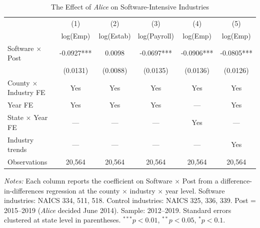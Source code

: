 \begin{table}[t]
\centering
\caption{The Effect of \textit{Alice} on Software-Intensive Industries}
\label{tab:main}
\begin{tabular}{lccccc}
\toprule
 & (1) & (2) & (3) & (4) & (5) \\
 & log(Emp) & log(Estab) & log(Payroll) & log(Emp) & log(Emp) \\
\midrule
Software $\times$ Post & -0.0927*** & 0.0098 & -0.0697*** & -0.0906*** & -0.0805*** \\
 & (0.0131) & (0.0088) & (0.0135) & (0.0136) & (0.0126) \\
\midrule
County $\times$ Industry FE & Yes & Yes & Yes & Yes & Yes \\
Year FE & Yes & Yes & Yes & --- & Yes \\
State $\times$ Year FE & --- & --- & --- & Yes & --- \\
Industry trends & --- & --- & --- & --- & Yes \\
Observations & 20,564 & 20,564 & 20,564 & 20,564 & 20,564 \\
\bottomrule
\end{tabular}
\begin{tablenotes}
\item \textit{Notes:} Each column reports the coefficient on Software $\times$ Post from a
difference-in-differences regression at the county $\times$ industry $\times$ year level.
Software industries: NAICS 334, 511, 518. Control industries: NAICS 325, 336, 339.
Post = 2015--2019 (\textit{Alice} decided June 2014). Sample: 2012--2019.
Standard errors clustered at state level in parentheses.
$^{***}p<0.01$, $^{**}p<0.05$, $^{*}p<0.1$.
\end{tablenotes}
\end{table}
